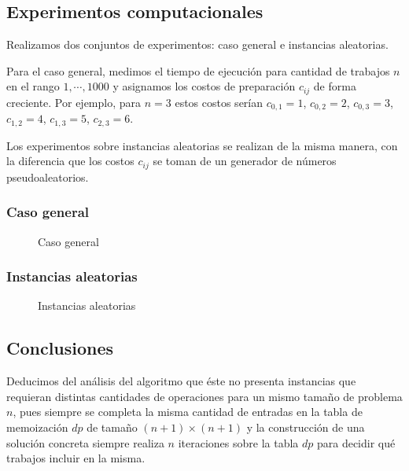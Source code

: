 \documentclass[a4paper, 10pt, twoside]{article}
\newcommand{\tresgraficos}[3]{
    \newcommand{\separacion}{-2.2em}
    \vspace{\separacion}
    
    \vspace{\separacion}
    
    \vspace{\separacion}
    
}
\begin{document}
\subsection{Experimentos computacionales}

Realizamos dos conjuntos de experimentos: caso general e instancias aleatorias.

Para el caso general, medimos el tiempo de ejecución para cantidad de trabajos $n$ en el rango $1, \cdots, 1000$ y asignamos los costos de preparación $c_{ij}$ de forma creciente. Por ejemplo, para $n = 3$ estos costos serían $c_{0, 1} = 1$, $c_{0, 2} = 2$, $c_{0, 3} = 3$, $c_{1, 2} = 4$, $c_{1, 3} = 5$, $c_{2, 3} = 6$.

Los experimentos sobre instancias aleatorias se realizan de la misma manera, con la diferencia que los costos $c_{ij}$ se toman de un generador de números pseudoaleatorios.

\newpage


\subsubsection{Caso general}

\begin{figure}[H]
  \centering
  \tresgraficos{problema1-caso-general}
               {problema1-caso-general-n}
               {problema1-caso-general-n2}
  \caption{Caso general}
\end{figure}


\subsubsection{Instancias aleatorias}

\begin{figure}[H]
  \centering
  \tresgraficos{problema1-instancias-aleatorias}
               {problema1-instancias-aleatorias-n}
               {problema1-instancias-aleatorias-n2}
  \caption{Instancias aleatorias}
\end{figure}


\subsection{Conclusiones}

Deducimos del análisis del algoritmo que éste no presenta instancias que requieran distintas cantidades de operaciones para un mismo tamaño de problema $n$, pues siempre se completa la misma cantidad de entradas en la tabla de memoización $dp$ de tamaño $(n + 1) \times (n + 1)$ y la construcción de una solución concreta siempre realiza $n$ iteraciones sobre la tabla $dp$ para decidir qué trabajos incluir en la misma.
\end{document}
